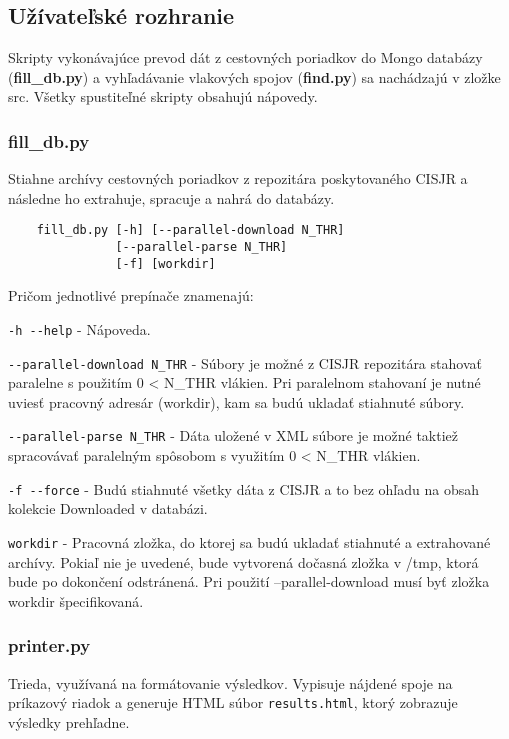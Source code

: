\documentclass[10pt,xcolor=pdflatex,dvipsnames,table,oneside]{book}
\begin{document}
\subsection*{Užívateľské rozhranie}
\par Skripty vykonávajúce prevod dát z cestovných poriadkov do Mongo databázy (\textbf{fill\_db.py}) a vyhľadávanie vlakových spojov (\textbf{find.py}) sa nachádzajú v zložke src. Všetky spustiteľné skripty obsahujú nápovedy.
\newpage

\subsubsection*{fill\_db.py}
Stiahne archívy cestovných poriadkov z repozitára poskytovaného CISJR a následne ho extrahuje, spracuje a nahrá do databázy.
\newline
\begin{verbatim}
    fill_db.py [-h] [--parallel-download N_THR] 
               [--parallel-parse N_THR] 
               [-f] [workdir]
\end{verbatim}
\newline
Pričom jednotlivé prepínače znamenajú: 

\par \verb|-h --help|  - Nápoveda.
\newline
\par \verb|--parallel-download N_THR|  - Súbory je možné z CISJR repozitára stahovať paralelne s použitím 0 < N\_THR vlákien. Pri paralelnom stahovaní je nutné uviesť pracovný adresár (workdir), kam sa budú ukladať stiahnuté súbory.
\newline
\par \verb|--parallel-parse N_THR|  - Dáta uložené v XML súbore je možné taktiež spracovávať paralelným spôsobom s využitím 0 < N\_THR vlákien.
\newline
\par \verb|-f --force| - Budú stiahnuté všetky dáta z CISJR a to bez ohľadu na obsah kolekcie Downloaded v databázi.
\newline
\par \verb|workdir|  - Pracovná zložka, do ktorej sa budú ukladať stiahnuté a extrahované archívy. Pokiaľ nie je uvedené, bude vytvorená dočasná zložka v /tmp, ktorá bude po dokončení odstránená. Pri použití --parallel-download musí byť zložka workdir špecifikovaná.

\subsubsection*{printer.py}
\par Trieda, využívaná na formátovanie výsledkov. Vypisuje nájdené spoje na príkazový riadok a generuje HTML súbor \verb|results.html|, ktorý zobrazuje výsledky prehľadne.
\end{document}
